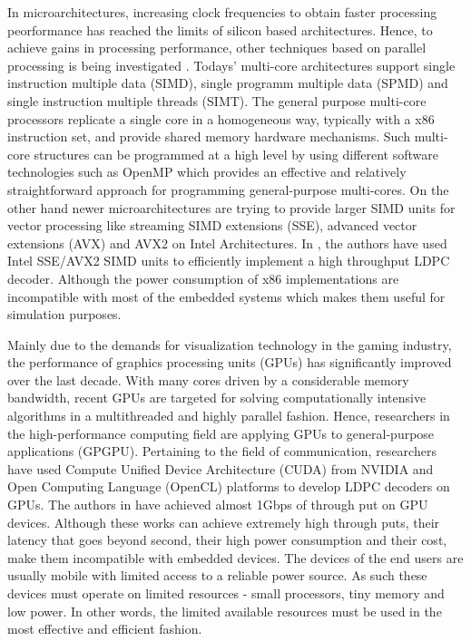 \documentclass[conference]{IEEEtran}
\begin{document}
In microarchitectures, increasing clock frequencies to obtain faster processing peorformance has reached the limits of silicon based architectures. Hence, to achieve gains in processing performance, other techniques based on parallel processing is being investigated \cite{art_ldpc_cpu1}. Todays' multi-core architectures support single instruction multiple data (SIMD), single programm multiple data (SPMD) and single instruction multiple threads (SIMT). The general purpose multi-core processors replicate a single core in a homogeneous way, typically with a x86 instruction set, and provide shared memory hardware mechanisms\cite{art_massively}. Such multi-core structures can be programmed at a high level by using different software technologies \cite{art_multicore_techs} such as OpenMP \cite{art_openMp_book} which provides an effective and relatively straightforward approach for programming general-purpose multi-cores. On the other hand newer microarchitectures are trying to provide larger SIMD units for vector processing like streaming SIMD extensions (SSE), advanced vector extensions (AVX) and AVX2 \cite{art_intel_sse} on Intel Architectures. In \cite{art_ldpc_cpu1}, the authors have used Intel SSE/AVX2 SIMD units to efficiently implement a high throughput LDPC decoder. Although the power consumption of x86 implementations are incompatible with most of the embedded systems which makes them useful for simulation purposes.

Mainly due to the demands for visualization technology in the gaming industry, the performance of graphics processing units (GPUs) has significantly improved over the last decade. With many cores driven by a considerable memory bandwidth, recent GPUs are targeted for solving computationally intensive algorithms in a multithreaded and highly parallel fashion. Hence, researchers in the high-performance computing field are applying GPUs to general-purpose applications (GPGPU). Pertaining to the field of communication, researchers have used Compute Unified Device Architecture (CUDA) from NVIDIA \cite{art_gpu_0,art_cuda_openmp, art_memory_coalesced, art_optimize_0, art_layered1} and Open Computing Language (OpenCL) \cite{art_ldpc_OpenCl} platforms to develop LDPC decoders on GPUs. The authors in \cite{art_gpu_0} have achieved almost 1Gbps of through put on GPU devices. Although these works can achieve extremely high through puts, their latency that goes beyond second, their high power consumption and their cost, make them incompatible with embedded devices. The devices of the end users are usually mobile with limited access to a reliable power source. As such these devices must operate on limited resources - small processors, tiny memory and low power. In other words, the limited available resources must be used in the most effective and efficient fashion.
\end{document}
